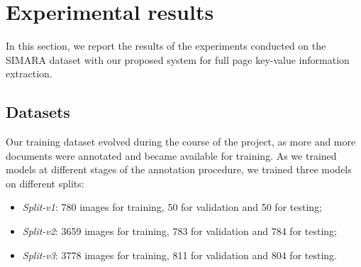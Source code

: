 \documentclass[runningheads]{llncs}
\begin{document}
\section{Experimental results}
In this section, we report the results of the experiments conducted on the SIMARA dataset with our proposed system for full page key-value information extraction.

\subsection{Datasets}

Our training dataset evolved during the course of the project, as more and more documents were annotated and became available for training. 
As we trained models at different stages of the annotation procedure, we trained three models on different splits:
\begin{itemize}
    \item \textit{Split-v1}: 780 images for training, 50 for validation and  50 for testing; 
     \item \textit{Split-v2}: 3659 images for training, 783 for validation and 784 for testing; 
      \item \textit{Split-v3}: 3778 images for training, 811 for validation and 804 for testing. 
\end{itemize}
\end{document}
